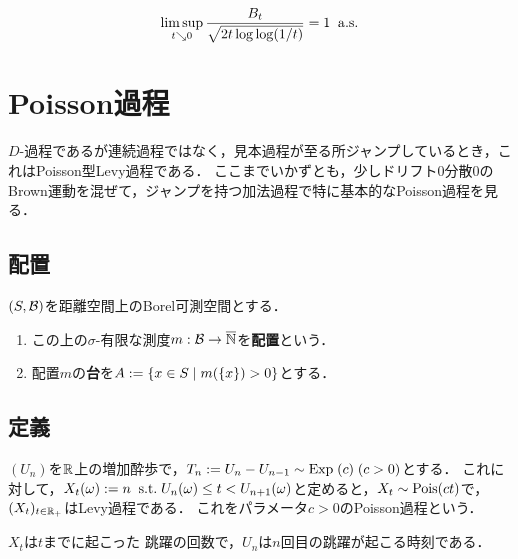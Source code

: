 \documentclass[uplatex,dvipdfmx]{jsreport}
\begin{document}
\begin{theorem}[重複対数の法則]
    \[\limsup_{t\searrow0}\frac{B_t}{\sqrt{2t\log\log(1/t)}}=1\;\;\mathrm{a.s.}\]
\end{theorem}

\section{Poisson過程}

\begin{tcolorbox}[colframe=ForestGreen, colback=ForestGreen!10!white,breakable,colbacktitle=ForestGreen!40!white,coltitle=black,fonttitle=\bfseries\sffamily,
title=]
    $D$-過程であるが連続過程ではなく，見本過程が至る所ジャンプしているとき，これはPoisson型Levy過程である．
    ここまでいかずとも，少しドリフト$0$分散$0$のBrown運動を混ぜて，ジャンプを持つ加法過程で特に基本的なPoisson過程を見る．
\end{tcolorbox}

\subsection{配置}

\begin{definition}
    $(S,\mathcal{B})$を距離空間上のBorel可測空間とする．
    \begin{enumerate}
        \item この上の$\sigma$-有限な測度$m:\mathcal{B}\to\overline{\mathbb{N}}$を\textbf{配置}という．
        \item 配置$m$の\textbf{台}を$A:=\left\{x\in S\mid m(\{x\})>0\right\}$とする．
    \end{enumerate}
\end{definition}

\subsection{定義}

\begin{theorem}
    $(U_n)$を$\mathbb{R}$上の増加酔歩で，$T_n:=U_n-U_{n-1}\sim\mathrm{Exp}\;(c)\;(c>0)$とする．
    これに対して，$X_t(\omega):=n\;\;\mathrm{s.t.}\; U_n(\omega)\le t<U_{n+1}(\omega)$と定めると，$X_t\sim\mathrm{Pois}(ct)$で，$(X_t)_{t\in\mathbb{R}_+}$はLevy過程である．
    これをパラメータ$c>0$のPoisson過程という．
\end{theorem}
\begin{remarks}
    $X_t$は$t$までに起こった
    跳躍の回数で，$U_n$は$n$回目の跳躍が起こる時刻である．
\end{remarks}
\end{document}
